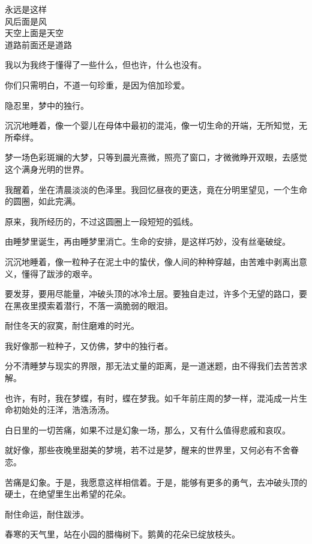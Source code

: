 		\longpoem{}{}{}
			永远是这样 \\
			风后面是风 \\
			天空上面是天空 \\
			道路前面还是道路
		\endlongpoem

		我以为我终于懂得了一些什么，但也许，什么也没有。\par
		你们只需明白，不道一句珍重，是因为倍加珍爱。

	\endwriting



		隐忍里，梦中的独行。

		\vspace{1em}
		沉沉地睡着，像一个婴儿在母体中最初的混沌，像一切生命的开端，无所知觉，无所牵绊。\par
		梦一场色彩斑斓的大梦，只等到晨光熹微，照亮了窗口，才微微睁开双眼，去感觉这个满身光明的世界。\par
		我醒着，坐在清晨淡淡的色泽里。我回忆昼夜的更迭，竟在分明里望见，一个生命的圆圈，如此完满。\par
		原来，我所经历的，不过这圆圈上一段短短的弧线。\par
		由睡梦里诞生，再由睡梦里消亡。生命的安排，是这样巧妙，没有丝毫破绽。\par
		沉沉地睡着，像一粒种子在泥土中的蛰伏，像人间的种种穿越，由苦难中剥离出意义，懂得了跋涉的艰辛。\par
		要发芽，要用尽能量，冲破头顶的冰冷土层。要独自走过，许多个无望的路口，要在黑夜里摸索着潜行，不落一滴脆弱的眼泪。\par
		耐住冬天的寂寞，耐住磨难的时光。\par
		我好像那一粒种子，又仿佛，梦中的独行者。\par
		分不清睡梦与现实的界限，那无法丈量的距离，是一道迷题，由不得我们去苦苦求解。\par
		也许，有时，我在梦蝶，有时，蝶在梦我。如千年前庄周的梦一样，混沌成一片生命初始处的汪洋，浩浩汤汤。\par
		白日里的一切苦痛，如果不过是幻象一场，那么，又有什么值得悲戚和哀叹。\par
		就好像，那些夜晚里甜美的梦境，若不过是梦，醒来的世界里，又何必有不舍眷恋。\par
		苦痛是幻象。于是，我愿意这样相信着。于是，能够有更多的勇气，去冲破头顶的硬土，在绝望里生出希望的花朵。\par
		耐住命运，耐住跋涉。\par
		春寒的天气里，站在小园的腊梅树下。鹅黄的花朵已绽放枝头。\par

